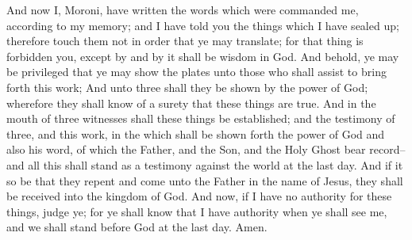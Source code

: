 \bchapter
\bverse \iffalse And now I, Moroni, have written the words which were commanded me, according to my memory; and I have told you the things which I have sealed up; therefore touch them not in order that ye may translate; for that thing is forbidden you, except by and by it shall be wisdom in God. \fi
And now I, Moroni, have written the words which were commanded me, according to my memory; and I have told you the things which I have sealed up; therefore touch them not in order that ye may translate; for that thing is forbidden you, except by and by it shall be wisdom in God.
\bverse \iffalse And behold, ye may be privileged that ye may show the plates unto those who shall assist to bring forth this work; \fi
And behold, ye may be privileged that ye may show the plates unto those who shall assist to bring forth this work;
\bverse \iffalse And unto three shall they be shown by the power of God; wherefore they shall know of a surety that these things are true. \fi
And unto three shall they be shown by the power of God; wherefore they shall know of a surety that these things are true.
\bverse \iffalse And in the mouth of three witnesses shall these things be established; and the testimony of three, and this work, in the which shall be shown forth the power of God and also his word, of which the Father, and the Son, and the Holy Ghost bear record--and all this shall stand as a testimony against the world at the last day. \fi
And in the mouth of three witnesses shall these things be established; and the testimony of three, and this work, in the which shall be shown forth the power of God and also his word, of which the Father, and the Son, and the Holy Ghost bear record--and all this shall stand as a testimony against the world at the last day.
\bverse \iffalse And if it so be that they repent and come unto the Father in the name of Jesus, they shall be received into the kingdom of God. \fi
And if it so be that they repent and come unto the Father in the name of Jesus, they shall be received into the kingdom of God.
\bverse \iffalse And now, if I have no authority for these things, judge ye; for ye shall know that I have authority when ye shall see me, and we shall stand before God at the last day. Amen. \fi
And now, if I have no authority for these things, judge ye; for ye shall know that I have authority when ye shall see me, and we shall stand before God at the last day. Amen.

